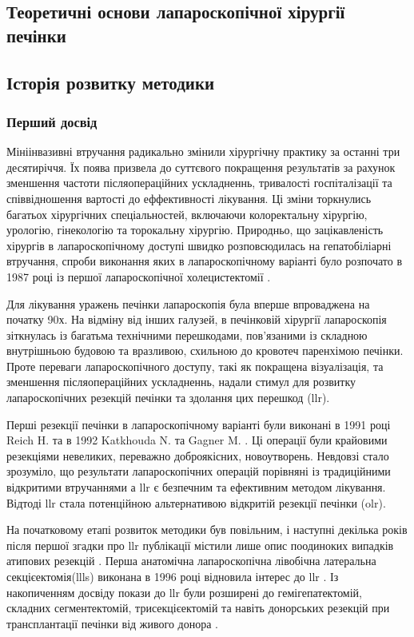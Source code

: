 \begin{refsection}
\chapter{Теоретичні основи лапароскопічної хірургії печінки}

\section{Історія розвитку методики}
\subsection{Перший досвід}
Мініінвазивні втручання радикально змінили хірургічну практику за останні три десятиріччя. Їх поява призвела до суттєвого покращення результатів за рахунок зменшення частоти післяопераційних ускладненнь, тривалості госпіталізації та співвідношення вартості до еффективності лікування.  Ці зміни торкнулись багатьох хірургічних спеціальностей, включаючи колоректальну хірургію, урологію, гінекологію та торокальну хірургію. Природньо, що зацікавленість хірургів в лапароскопічному доступі швидко розповсюдилась на гепатобіліарні втручання, спроби виконання яких в лапароскопічному варіанті було розпочато в 1987 році із першої лапароскопічної холецистектомії \cite{Litynski}. 

Для лікування уражень печінки лапароскопія була вперше впроваджена на початку 90х. На відміну від інших галузей, в печінковій хірургії лапароскопія зіткнулась із багатьма технічними перешкодами, пов'язаними із складною внутрішньою будовою та вразливою, схильною до кровотеч паренхімою печінки. Проте переваги лапароскопічного доступу, такі як покращена візуалізація, та зменшення післяопераційних ускладненнь, надали стимул для розвитку лапароскопічних резекцій печінки та здолання цих перешкод (\acrshort{llr}). 

Перші резекції печінки в лапароскопічному варіанті були виконані в 1991 році Reich H. \cite{Reich1991a} та  в 1992 Katkhouda N. \cite{Katkhouda1992} та Gagner M. \cite{GAGNER1992}. Ці операції були крайовими резекціями невеликих, переважно доброякісних, новоутворень. Невдовзі стало зрозуміло, що результати лапароскопічних операцій порівняні із традиційними відкритими втручаннями а \acrshort{llr} є безпечним та ефективним методом лікування. Відтоді \acrshort{llr} стала потенційною альтернативою відкритій резекції печінки (\acrshort{olr}). 

На початковому етапі розвиток методики був повільним, і наступні декілька років після першої згадки про \acrshort{llr} публікації містили лише опис поодиноких випадків атипових резекцій \cite{Klotz1993, Cunningham1995}. Перша анатомічна лапароскопічна лівобічна латеральна секцієектомія(\acrshort{llls}) виконана в 1996 році \cite{Azagra1996}  відновила інтерес до \acrshort{llr}  \cite{Hashizume1995}.  Із накопиченням досвіду покази до \acrshort{llr} були розширені до гемігепатектомій, складних сегментектомій, трисекцієектомій та навіть донорських резекцій при трансплантації печінки від живого донора \cite{Dagher2009, Cherqui2002, Jia2018}. 


\end{refsection}
